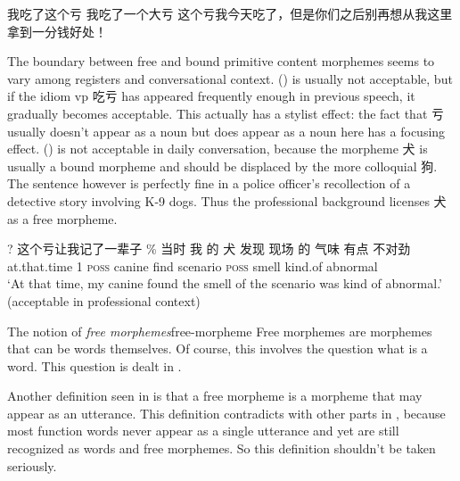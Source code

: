 \documentclass[UTF8, a4paper, oneside, scheme=plain, 12pt]{ctexrep}
\newcommand*{\citesec}[1]{\S~{#1}}
\newcommand*{\term}[1]{\emph{#1}}
\newcommand{\translate}[1]{`#1'}
\newcommand*{\category}[1]{\textsc{#1}}
\begin{document}
\begin{exe}
    \ex\label{ex:pos.morpheme.chikui} \begin{xlist}
        \ex 我吃了这个亏
        \ex 我吃了一个大亏
        \ex 这个亏我今天吃了，但是你们之后别再想从我这里拿到一分钱好处！
    \end{xlist}
\end{exe}

The boundary between free and bound primitive content morphemes 
seems to vary among registers and conversational context. 
() is usually not acceptable,
but if the idiom \acs{vp} 吃亏 has appeared frequently enough
in previous speech, 
it gradually becomes acceptable.
This actually has a stylist effect: 
the fact that 亏 usually doesn't appear as a noun 
but does appear as a noun here 
has a focusing effect.
() is not acceptable in daily conversation,
because the morpheme 犬 is usually a bound morpheme 
and should be displaced by the more colloquial 狗.
The sentence however is perfectly fine in 
a police officer's recollection of a detective story involving K-9 dogs.
Thus the professional background licenses 犬 as a free morpheme.

\begin{exe}
    \ex\label{ex:pos.morpheme.kui-2} 
    ? 这个亏让我记了一辈子
    \ex\label{ex:pos.morpheme.quan} 
    \gll \% 当时 我 的 犬 发现 现场 的 气味 有点 不对劲 \\
    {} at.that.time 1 \category{poss} canine find scenario \category{poss} smell kind.of abnormal \\
    \glt \translate{At that time, my canine found the smell of the scenario was kind of abnormal.}
    (acceptable in professional context)
\end{exe}

\begin{infobox}{The notion of \term{free morphemes}}{free-morpheme}
    Free morphemes are morphemes that can be words themselves.
    Of course, this involves the question what is a word. 
    This question is dealt in .

    Another definition seen in \citet[\citesec{1.1.2}]{zhudexigrammar}
    is that a free morpheme is a morpheme that may appear as an utterance.
    This definition contradicts with other parts in \citet{zhudexigrammar},
    because most function words never appear as a single utterance
    and yet are still recognized as words
    and free morphemes.
    So this definition shouldn't be taken seriously.
\end{infobox}
\end{document}
